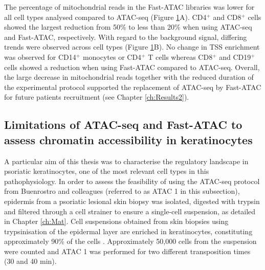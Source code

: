 \begin{figure}[htbp]
\label{figure:ATAC_vs_FAST_ATAC}
\end{figure} 



The percentage of mitochondrial reads in the Fast-ATAC libraries was lower for all cell types analysed compared to ATAC-seq (Figure \ref{figure:ATAC_vs_FAST_ATAC}A). CD4$^+$ and CD8$^+$ cells showed the largest reduction from 50\% to less than 20\% when using ATAC-seq and Fast-ATAC, respectively. With regard to the background signal, differing trends were observed across cell types (Figure \ref{figure:ATAC_vs_FAST_ATAC}B). No change in TSS enrichment was observed for CD14$^+$ monocytes or CD4$^+$ T cells whereas CD8$^+$ and CD19$^+$ cells showed a reduction when using Fast-ATAC compared to ATAC-seq. Overall, the large decrease in mitochondrial reads together with the reduced duration of the experimental protocol supported the replacement of ATAC-seq by Fast-ATAC for future patients recruitment (see Chapter \ref{ch:Results2}). 




\subsection{Limitations of ATAC-seq and Fast-ATAC to assess chromatin accessibility in keratinocytes}
A particular aim of this thesis was to characterise the regulatory landscape in psoriatic keratinocytes, one of the most relevant cell types in this pathophysiology. In order to assess the feasibility of using the ATAC-seq protocol from Buenrostro and colleagues \parencite{Buenrostro2013} (referred to as ATAC 1 in this subsection), epidermis from a psoriatic lesional skin biopsy was isolated, digested with trypsin and filtered through a cell strainer to ensure a single-cell suspension, as detailed in Chapter \ref{ch:Mat}. Cell suspensions obtained from skin biopsies using trypsinisation of the epidermal layer are enriched in keratinocytes, constituting approximately 90\% of the cells \parencite{Haftek1986}.  Approximately 50,000 cells from the suspension were counted and ATAC 1 was performed for two different transposition times (30 and 40 min). %

